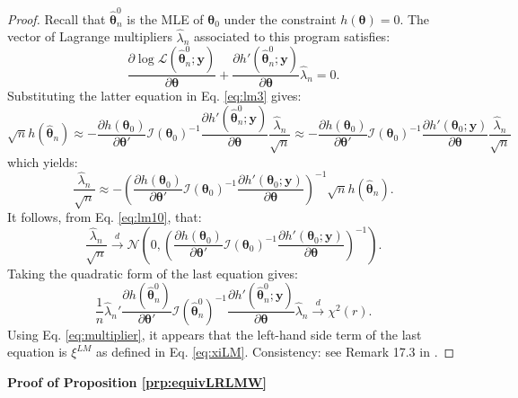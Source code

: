 \documentclass[
  12pt,
]{book}
\theoremstyle{definition}
\theoremstyle{definition}
\theoremstyle{definition}
\theoremstyle{definition}
\theoremstyle{remark}
\begin{document}
\begin{proof}
Recall that \(\hat{\boldsymbol\theta}^0_n\) is the MLE of \(\boldsymbol\theta_0\) under the constraint \(h(\boldsymbol\theta)=0\). The vector of Lagrange multipliers \(\hat\lambda_n\) associated to this program satisfies:
\begin{equation}
\frac{\partial \log \mathcal{L}(\hat{\boldsymbol\theta}^0_n;\mathbf{y})}{\partial \boldsymbol\theta}+ \frac{\partial h'(\hat{\boldsymbol\theta}^0_n;\mathbf{y})}{\partial \boldsymbol\theta}\hat\lambda_n = 0.\label{eq:multiplier}
\end{equation}
Substituting the latter equation in Eq. \eqref{eq:lm3} gives:
\[
\sqrt{n}h(\hat{\boldsymbol\theta}_n) \approx
- \dfrac{\partial h(\boldsymbol\theta_0)}{\partial \boldsymbol\theta'} \mathcal{I}(\boldsymbol\theta_0)^{-1}
\frac{\partial h'(\hat{\boldsymbol\theta}^0_n;\mathbf{y})}{\partial \boldsymbol\theta} \frac{\hat\lambda_n}{\sqrt{n}} \approx
- \dfrac{\partial h(\boldsymbol\theta_0)}{\partial \boldsymbol\theta'} \mathcal{I}(\boldsymbol\theta_0)^{-1}
\frac{\partial h'(\boldsymbol\theta_0;\mathbf{y})}{\partial \boldsymbol\theta} \frac{\hat\lambda_n}{\sqrt{n}}
\]
which yields:
\begin{equation}
\frac{\hat\lambda_n}{\sqrt{n}} \approx - \left(
\dfrac{\partial h(\boldsymbol\theta_0)}{\partial \boldsymbol\theta'} \mathcal{I}(\boldsymbol\theta_0)^{-1}
\frac{\partial h'(\boldsymbol\theta_0;\mathbf{y})}{\partial \boldsymbol\theta}
\right)^{-1}
\sqrt{n}h(\hat{\boldsymbol\theta}_n).\label{eq:lm20}
\end{equation}
It follows, from Eq. \eqref{eq:lm10}, that:
\[
\frac{\hat\lambda_n}{\sqrt{n}} \overset{d}{\rightarrow} \mathcal{N}\left(0,\left(
\dfrac{\partial h(\boldsymbol\theta_0)}{\partial \boldsymbol\theta'} \mathcal{I}(\boldsymbol\theta_0)^{-1}
\frac{\partial h'(\boldsymbol\theta_0;\mathbf{y})}{\partial \boldsymbol\theta}
\right)^{-1}\right).
\]
Taking the quadratic form of the last equation gives:
\[
\frac{1}{n}\hat\lambda_n' \dfrac{\partial h(\hat{\boldsymbol\theta}^0_n)}{\partial \boldsymbol\theta'} \mathcal{I}(\hat{\boldsymbol\theta}^0_n)^{-1}
\frac{\partial h'(\hat{\boldsymbol\theta}^0_n;\mathbf{y})}{\partial \boldsymbol\theta} \hat\lambda_n \overset{d}{\rightarrow} \chi^2(r).
\]
Using Eq. \eqref{eq:multiplier}, it appears that the left-hand side term of the last equation is \(\xi^{LM}\) as defined in Eq. \eqref{eq:xiLM}. Consistency: see Remark 17.3 in \citet{gourieroux_monfort_1995}.
\end{proof}

\textbf{Proof of Proposition \ref{prp:equivLRLMW}}
\end{document}
